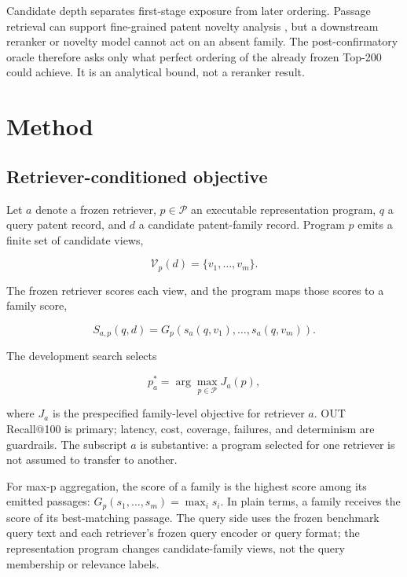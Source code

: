 \documentclass[final,5p,times,twocolumn]{elsarticle}
\begin{document}
Candidate depth separates first-stage exposure from later ordering. Passage
retrieval can support fine-grained patent novelty analysis
\cite{finepatents2026}, but a downstream reranker or novelty model cannot act
on an absent family. The post-confirmatory oracle therefore asks only what
perfect ordering of the already frozen Top-200 could achieve. It is an
analytical bound, not a reranker result.

\section{Method}

\subsection{Retriever-conditioned objective}

Let \(a\) denote a frozen retriever, \(p\in\mathcal{P}\) an executable
representation program, \(q\) a query patent record, and \(d\) a candidate
patent-family record. Program \(p\) emits a finite set of candidate views,

\begin{equation}
 \mathcal{V}_{p}(d)=\{v_1,\ldots,v_m\}.
\end{equation}

The frozen retriever scores each view, and the program maps those scores to a
family score,

\begin{equation}
 S_{a,p}(q,d)=G_p\!\left(s_a(q,v_1),\ldots,s_a(q,v_m)\right).
\end{equation}

The development search selects

\begin{equation}
 p_a^{*}=\arg\max_{p\in\mathcal{P}}J_a(p),
\end{equation}

where \(J_a\) is the prespecified family-level objective for retriever \(a\). OUT
Recall@100 is primary; latency, cost, coverage, failures, and determinism are
guardrails. The subscript \(a\) is substantive: a program selected for one
retriever is not assumed to transfer to another.

For max-p aggregation, the score of a family is the highest score among its
emitted passages: \(G_p(s_1,\ldots,s_m)=\max_i s_i\). In plain terms, a
family receives the score of its best-matching passage. The query side uses
the frozen benchmark query text and each retriever's frozen query encoder or
query format; the representation program changes candidate-family views, not
the query membership or relevance labels.
\end{document}
